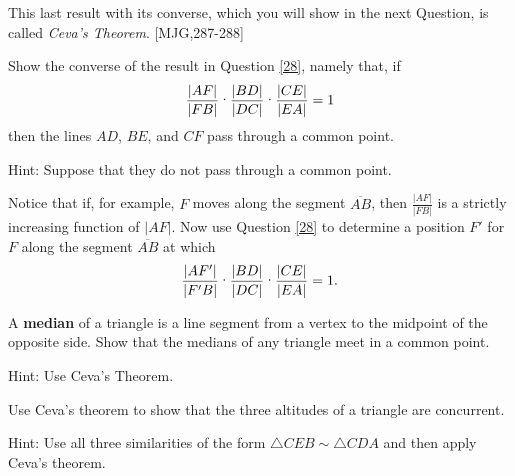 \documentclass{ximera}
\begin{document}
This last result with its converse, which you will show in the next Question,
is called \textit{Ceva's Theorem}. [MJG,287-288]

\begin{question}
Show the converse of the result in Question \ref{28}, namely
that, if%
\[
\frac{\left\vert AF\right\vert }{\left\vert FB\right\vert }%
\text{\textperiodcentered}\frac{\left\vert BD\right\vert }{\left\vert
DC\right\vert }\text{\textperiodcentered}\frac{\left\vert CE\right\vert
}{\left\vert EA\right\vert }=1
\]
then the lines $AD$, $BE$, and $CF$ pass through a common point.

Hint: Suppose that they do not pass through a common point.
\begin{image}
\end{image}
Notice that if, for example, $F$ moves along the segment
$\overline{AB}$, then $\frac{\left\vert AF\right\vert }{\left\vert
FB\right\vert }$ is a strictly increasing function of $\left\vert
AF\right\vert $. Now use Question \ref{28} to determine a position
$F'$ for $F$ along the segment $\overline{AB}$ at which
\[
\frac{\left\vert AF'\right\vert }{\left\vert F'B\right\vert
}\text{\textperiodcentered}\frac{\left\vert BD\right\vert }{\left\vert
DC\right\vert }\text{\textperiodcentered}\frac{\left\vert CE\right\vert
}{\left\vert EA\right\vert }=1.
\]
\end{question}

\begin{question}
A \textbf{median} of a triangle is a line segment from a vertex
to the midpoint of the opposite side. Show that the medians of any triangle
meet in a common point.

Hint: Use Ceva's Theorem.
\end{question}

\begin{question}
Use Ceva's theorem to show that the three altitudes of a
triangle are concurrent.
\begin{image}
\end{image}
Hint: Use all three similarities of the form $\triangle
CEB\sim\triangle CDA$ and then apply Ceva's theorem.
\end{question}
\end{document}
